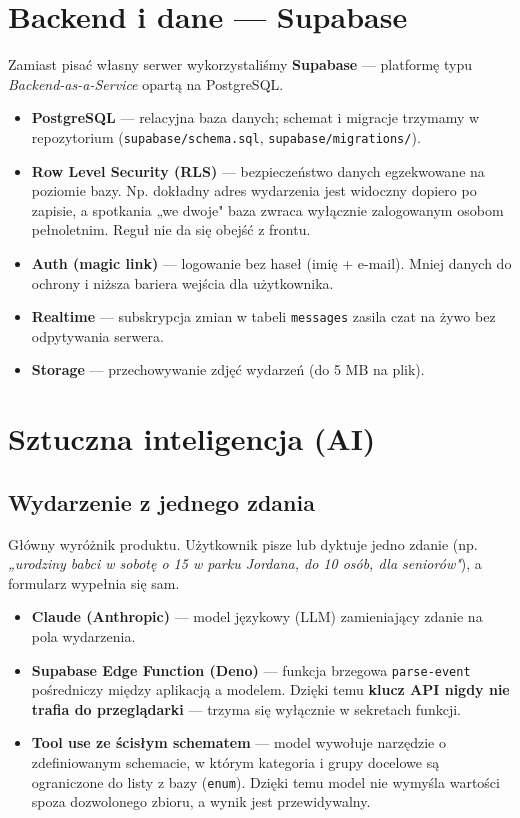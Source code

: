 \documentclass[11pt,a4paper]{article}
\begin{document}
\section{Backend i dane --- Supabase}

Zamiast pisać własny serwer wykorzystaliśmy \textbf{Supabase} --- platformę typu
\emph{Backend-as-a-Service} opartą na PostgreSQL.

\begin{itemize}
  \item \textbf{PostgreSQL} --- relacyjna baza danych; schemat i migracje trzymamy w repozytorium
        (\texttt{supabase/schema.sql}, \texttt{supabase/migrations/}).
  \item \textbf{Row Level Security (RLS)} --- bezpieczeństwo danych egzekwowane na poziomie bazy.
        Np. dokładny adres wydarzenia jest widoczny dopiero po zapisie, a spotkania „we dwoje"
        baza zwraca wyłącznie zalogowanym osobom pełnoletnim. Reguł nie da się obejść z frontu.
  \item \textbf{Auth (magic link)} --- logowanie bez haseł (imię + e-mail). Mniej danych do ochrony
        i niższa bariera wejścia dla użytkownika.
  \item \textbf{Realtime} --- subskrypcja zmian w tabeli \texttt{messages} zasila czat na żywo
        bez odpytywania serwera.
  \item \textbf{Storage} --- przechowywanie zdjęć wydarzeń (do 5 MB na plik).
\end{itemize}

\section{Sztuczna inteligencja (AI)}

\subsection{Wydarzenie z jednego zdania}
Główny wyróżnik produktu. Użytkownik pisze lub dyktuje jedno zdanie (np. \emph{„urodziny babci
w sobotę o 15 w parku Jordana, do 10 osób, dla seniorów"}), a formularz wypełnia się sam.

\begin{itemize}
  \item \textbf{Claude (Anthropic)} --- model językowy (LLM) zamieniający zdanie na pola wydarzenia.
  \item \textbf{Supabase Edge Function (Deno)} --- funkcja brzegowa \texttt{parse-event} pośredniczy
        między aplikacją a modelem. Dzięki temu \textbf{klucz API nigdy nie trafia do przeglądarki}
        --- trzyma się wyłącznie w sekretach funkcji.
  \item \textbf{Tool use ze ścisłym schematem} --- model wywołuje narzędzie o zdefiniowanym schemacie,
        w którym kategoria i grupy docelowe są ograniczone do listy z bazy (\texttt{enum}). Dzięki temu
        model nie wymyśla wartości spoza dozwolonego zbioru, a wynik jest przewidywalny.
\end{itemize}
\end{document}
